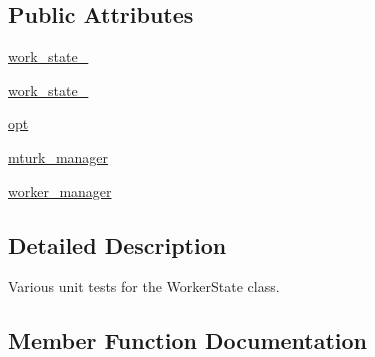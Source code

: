\subsection*{Public Attributes}
\begin{DoxyCompactItemize}
\item 
\hyperlink{classparlai_1_1mturk_1_1core_1_1test_1_1test__worker__manager_1_1TestWorkerState_afc50661404a6b3826b779c45c8e3887b}{work\+\_\+state\+\_}
\item 
\hyperlink{classparlai_1_1mturk_1_1core_1_1test_1_1test__worker__manager_1_1TestWorkerState_a18ba755d2fe6999cb6a0c6c348bc8ba2}{work\+\_\+state\+\_}
\item 
\hyperlink{classparlai_1_1mturk_1_1core_1_1test_1_1test__worker__manager_1_1TestWorkerState_a105cf005b8468f39b6e0e2521c0684be}{opt}
\item 
\hyperlink{classparlai_1_1mturk_1_1core_1_1test_1_1test__worker__manager_1_1TestWorkerState_a6e371447a6340ff175060a6f4dc1cca6}{mturk\+\_\+manager}
\item 
\hyperlink{classparlai_1_1mturk_1_1core_1_1test_1_1test__worker__manager_1_1TestWorkerState_ac5d2e9a4b453b85488aef75feb982517}{worker\+\_\+manager}
\end{DoxyCompactItemize}


\subsection{Detailed Description}
\begin{DoxyVerb}Various unit tests for the WorkerState class.
\end{DoxyVerb}
 

\subsection{Member Function Documentation}
\mbox{\label{classparlai_1_1mturk_1_1core_1_1test_1_1test__worker__manager_1_1TestWorkerState_a47d23608a1b8d69530edab71fd303709}} 
